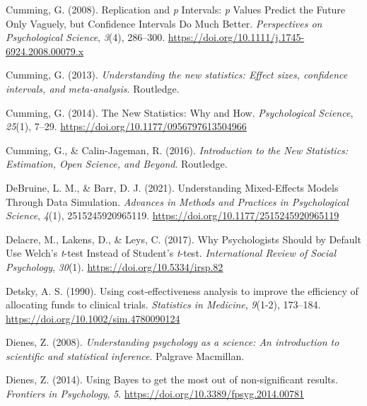 \documentclass[
  letterpaper,
  DIV=11,
  numbers=noendperiod]{scrreprt}
\newlength{\cslhangindent}
\newlength{\cslentryspacingunit} %
\newenvironment{CSLReferences}[2] %
 {%
  \setlength{\parindent}{0pt}
  \ifodd #1
  \let\oldpar\par
  \def\par{\hangindent=\cslhangindent\oldpar}
  \fi
  \setlength{\parskip}{#2\cslentryspacingunit}
 }%
 {}
\begin{document}
\begin{CSLReferences}{1}{0}
\leavevmode{}%
Cumming, G. (2008). Replication and {\emph{p}} {Intervals}: {\emph{p}}
{Values Predict} the {Future Only Vaguely}, but {Confidence Intervals Do
Much Better}. \emph{Perspectives on Psychological Science}, \emph{3}(4),
286--300. \url{https://doi.org/10.1111/j.1745-6924.2008.00079.x}

\leavevmode{}%
Cumming, G. (2013). \emph{Understanding the new statistics: {Effect}
sizes, confidence intervals, and meta-analysis}. {Routledge}.

\leavevmode{}%
Cumming, G. (2014). The {New Statistics}: {Why} and {How}.
\emph{Psychological Science}, \emph{25}(1), 7--29.
\url{https://doi.org/10.1177/0956797613504966}

\leavevmode{}%
Cumming, G., \& Calin-Jageman, R. (2016). \emph{Introduction to the {New
Statistics}: {Estimation}, {Open Science}, and {Beyond}}. {Routledge}.

\leavevmode{}%
DeBruine, L. M., \& Barr, D. J. (2021). Understanding {Mixed-Effects
Models Through Data Simulation}. \emph{Advances in Methods and Practices
in Psychological Science}, \emph{4}(1), 2515245920965119.
\url{https://doi.org/10.1177/2515245920965119}

\leavevmode{}%
Delacre, M., Lakens, D., \& Leys, C. (2017). Why {Psychologists Should}
by {Default Use Welch}'s {\emph{t}}-test {Instead} of {Student}'s
{\emph{t}}-test. \emph{International Review of Social Psychology},
\emph{30}(1). \url{https://doi.org/10.5334/irsp.82}

\leavevmode{}%
Detsky, A. S. (1990). Using cost-effectiveness analysis to improve the
efficiency of allocating funds to clinical trials. \emph{Statistics in
Medicine}, \emph{9}(1-2), 173--184.
\url{https://doi.org/10.1002/sim.4780090124}

\leavevmode{}%
Dienes, Z. (2008). \emph{Understanding psychology as a science: {An}
introduction to scientific and statistical inference}. {Palgrave
Macmillan}.

\leavevmode{}%
Dienes, Z. (2014). Using {Bayes} to get the most out of non-significant
results. \emph{Frontiers in Psychology}, \emph{5}.
\url{https://doi.org/10.3389/fpsyg.2014.00781}


\end{CSLReferences}
\end{document}

